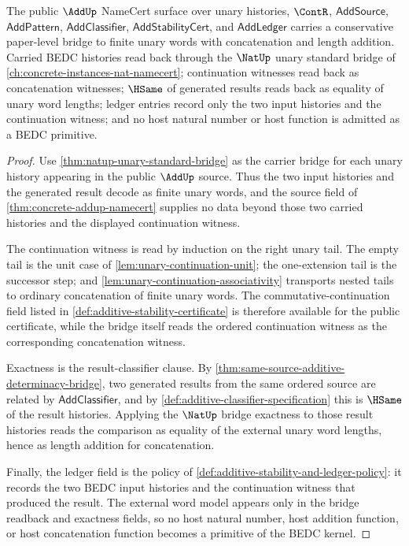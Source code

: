\begin{theorem}
\label{thm:addup-unary-standard-bridge}
The public $\AddUp$ NameCert surface over unary histories, $\ContR$,
$\mathsf{AddSource}$, $\mathsf{AddPattern}$, $\mathsf{AddClassifier}$,
$\mathsf{AddStabilityCert}$, and $\mathsf{AddLedger}$ carries a conservative
paper-level bridge to finite unary words with concatenation and length
addition. Carried BEDC histories read back through the $\NatUp$ unary standard
bridge of \autoref{ch:concrete-instances-nat-namecert}; continuation witnesses read back as concatenation witnesses;
$\HSame$ of generated results reads back as equality of unary word lengths;
ledger entries record only the two input histories and the continuation
witness; and no host natural number or host function is admitted as a BEDC
primitive.
\end{theorem}
\begin{proof}
Use \autoref{thm:natup-unary-standard-bridge} as the carrier bridge for each
unary history appearing in the public $\AddUp$ source. Thus the two input
histories and the generated result decode as finite unary words, and the
source field of \autoref{thm:concrete-addup-namecert} supplies no data beyond
those two carried histories and the displayed continuation witness.

The continuation witness is read by induction on the right unary tail. The
empty tail is the unit case of \autoref{lem:unary-continuation-unit}; the
one-extension tail is the successor step; and
\autoref{lem:unary-continuation-associativity} transports nested tails to
ordinary concatenation of finite unary words. The commutative-continuation
field listed in \autoref{def:additive-stability-certificate} is therefore
available for the public certificate, while the bridge itself reads the ordered
continuation witness as the corresponding concatenation witness.

Exactness is the result-classifier clause. By
\autoref{thm:same-source-additive-determinacy-bridge}, two generated results
from the same ordered source are related by $\mathsf{AddClassifier}$, and by
\autoref{def:additive-classifier-specification} this is $\HSame$ of the result
histories. Applying the $\NatUp$ bridge exactness to those result histories
reads the comparison as equality of the external unary word lengths, hence as
length addition for concatenation.

Finally, the ledger field is the policy of
\autoref{def:additive-stability-and-ledger-policy}: it records the two BEDC
input histories and the continuation witness that produced the result. The
external word model appears only in the bridge readback and exactness fields,
so no host natural number, host addition function, or host concatenation
function becomes a primitive of the BEDC kernel.
\end{proof}

